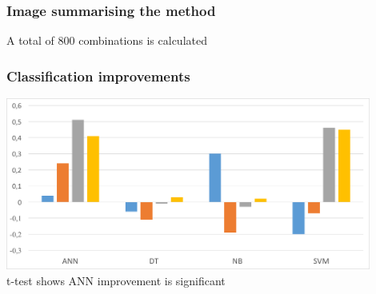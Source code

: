 \documentclass[aspectratio=1610]{beamer}
\begin{document}
\begin{frame}
  \frametitle{\hfill Image summarising the method}
  \begin{figure}[htp]
    \centering
  \end{figure}
  A total of 800 combinations is calculated
\end{frame}


\begin{frame}
  \frametitle{\hfill Classification improvements}

    \centering
    \includegraphics[width=0.9\textwidth]{images/accuracy_improv.png}
    \vspace{0.02\textheight}\\
    t-test shows ANN improvement is significant
\end{frame}
\end{document}
